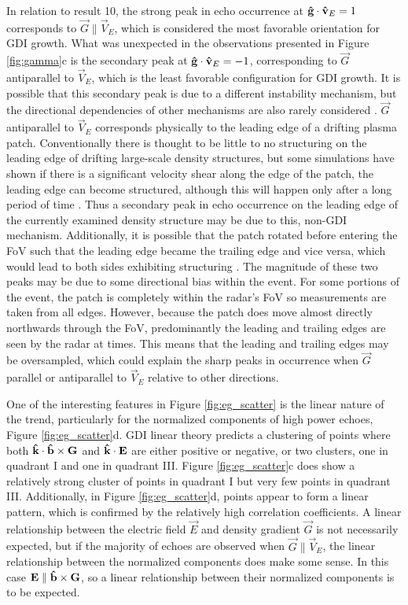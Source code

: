 In relation to result 10, the strong peak in echo occurrence at \(\mathbf{\hat{g}}\cdot\mathbf{\hat{v}}_E = 1\) corresponds to \(\vec{G} \parallel \vec{V}_E\), which is considered the most favorable orientation for GDI growth.  What was unexpected in the observations presented in Figure \ref{fig:gamma}c is the secondary peak at \(\mathbf{\hat{g}}\cdot\mathbf{\hat{v}}_E = -1\), corresponding to \(\vec{G}\) antiparallel to \(\vec{V}_E\), which is the least favorable configuration for GDI growth. It is possible that this secondary peak is due to a different instability mechanism, but the directional dependencies of other mechanisms are also rarely considered \citep{Burston2016}.  \(\vec{G}\) antiparallel to \(\vec{V}_E\) corresponds physically to the leading edge of a drifting plasma patch.  Conventionally there is thought to be little to no structuring on the leading edge of drifting large-scale density structures, but some simulations have shown if there is a significant velocity shear along the edge of the patch, the leading edge can become structured, although this will happen  only after a long period of time \citep{Gondarenko2006}. Thus a secondary peak in echo occurrence on the leading edge of the currently examined density structure may be due to this, non-GDI mechanism.  Additionally, it is possible that the patch rotated before entering the FoV such that the leading edge became the trailing edge and vice versa, which would lead to both sides exhibiting structuring \citep{Oksavik2010}.  The magnitude of these two peaks may be due to some directional bias within the event.  For some portions of the event, the patch is completely within the radar's FoV so measurements are taken from all edges.  However, because the patch does move almost directly northwards through the FoV, predominantly the leading and trailing edges are seen by the radar at times.  This means that the leading and trailing edges may be oversampled, which could explain the sharp peaks in occurrence when \(\vec{G}\) parallel or antiparallel to \(\vec{V}_E\) relative to other directions.

One of the interesting features in Figure \ref{fig:eg_scatter} is the linear nature of the trend, particularly for the normalized components of high power echoes, Figure \ref{fig:eg_scatter}d.  GDI linear theory predicts a clustering of points where both \(\mathbf{\hat{k}}\cdot\mathbf{\hat{b}}\times\mathbf{G}\) and \(\mathbf{\hat{k}}\cdot\mathbf{E}\) are either positive or negative, or two clusters, one in quadrant I and one in quadrant III.  Figure \ref{fig:eg_scatter}c does show a relatively strong cluster of points in quadrant I but very few points in quadrant III.  Additionally, in Figure \ref{fig:eg_scatter}d, points appear to form a linear pattern, which is confirmed by the relatively high correlation coefficients.  A linear relationship between the electric field \(\vec{E}\) and density gradient \(\vec{G}\) is not necessarily expected, but if the majority of echoes are observed when \(\vec{G}\parallel\vec{V}_E\), the linear relationship between the normalized components does make some sense.  In this case \(\mathbf{E}\parallel\mathbf{\hat{b}}\times\mathbf{G}\), so a linear relationship between their normalized components is to be expected.


